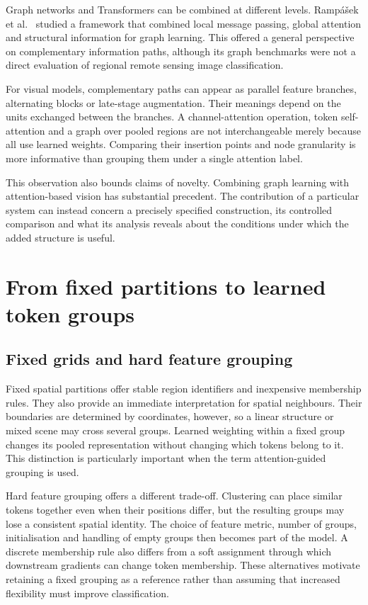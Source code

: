 Graph networks and Transformers can be combined at different levels.
Ramp\'{a}\v{s}ek et al.~\cite{rampasek2022graphgps} studied a framework that
combined local message passing, global attention and structural information
for graph learning. This offered a general perspective on complementary
information paths, although its graph benchmarks were not a direct evaluation
of regional remote sensing image classification.

For visual models, complementary paths can appear as parallel feature
branches, alternating blocks or late-stage augmentation. Their meanings
depend on the units exchanged between the branches. A channel-attention
operation, token self-attention and a graph over pooled regions are not
interchangeable merely because all use learned weights. Comparing their
insertion points and node granularity is more informative than grouping
them under a single attention label.

This observation also bounds claims of novelty. Combining graph learning
with attention-based vision has substantial precedent. The contribution of
a particular system can instead concern a precisely specified construction,
its controlled comparison and what its analysis reveals about the conditions
under which the added structure is useful.

\section{From fixed partitions to learned token groups}

\subsection{Fixed grids and hard feature grouping}

Fixed spatial partitions offer stable region identifiers and inexpensive
membership rules. They also provide an immediate interpretation for spatial
neighbours. Their boundaries are determined by coordinates, however, so a
linear structure or mixed scene may cross several groups. Learned weighting
within a fixed group changes its pooled representation without changing
which tokens belong to it. This distinction is particularly important when
the term attention-guided grouping is used.

Hard feature grouping offers a different trade-off. Clustering can place
similar tokens together even when their positions differ, but the resulting
groups may lose a consistent spatial identity. The choice of feature metric,
number of groups, initialisation and handling of empty groups then becomes
part of the model. A discrete membership rule also differs from a soft
assignment through which downstream gradients can change token membership.
These alternatives motivate retaining a fixed grouping as a reference
rather than assuming that increased flexibility must improve classification.

